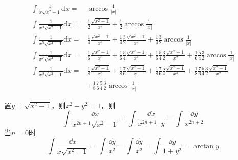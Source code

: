 \begin{theorem}[双曲根式倒数型]
\vspace{-15pt}
\begin{align*}
    \int\frac{1}{x\sqrt{x^{2}-1}}\mathrm{d}x=&\arccos\frac{1}{|x|}\\
    \int\frac{1}{x^{3}\sqrt{x^{2}-1}}\mathrm{d}x=&\frac{1}{2}\frac{\sqrt{x^{2}-1}}{x^{2}}+\frac{1}{2}\arccos\frac{1}{|x|}\\
    \int\frac{1}{x^5\sqrt{x^2-1}}\mathrm{d}x=&\frac{1}{4}\frac{\sqrt{x^2-1}}{x^4}+\frac{1}{4}\frac{3}{2}\frac{\sqrt{x^2-1}}{x^2}+\frac{1}{4}\frac{3}{2}\arccos\frac{1}{|x|}\\
    \int\frac{1}{x^7\sqrt{x^2-1}}\mathrm{d}x=&\frac{1}{6}\frac{\sqrt{x^2-1}}{x^6}+\frac{1}{6}\frac{5}{4}\frac{\sqrt{x^2-1}}{x^4}+\frac{1}{6}\frac{5}{4}\frac{3}{2}\frac{\sqrt{x^2-1}}{x^2}+\frac{1}{6}\frac{5}{4}\frac{3}{2}\arccos\frac{1}{|x|}\\
    \int\frac{1}{x^{9}\sqrt{x^{2}-1}}\mathrm{d}x=&\frac{1}{8}\frac{\sqrt{x^{2}-1}}{x^{8}}+\frac{1}{8}\frac{7}{6}\frac{\sqrt{x^{2}-1}}{x^{6}}+\frac{1}{8}\frac{7}{6}\frac{5}{4}\frac{\sqrt{x^{2}-1}}{x^{4}}+\frac{1}{8}\frac{7}{6}\frac{5}{4}\frac{3}{2}\frac{\sqrt{x^{2}-1}}{x^{2}}\\
    &+\frac{1}{8}\frac{7}{6}\frac{5}{4}\frac{3}{2}\arccos\frac{1}{|x|}
\end{align*}
\end{theorem}
置$y=\sqrt{x^{2}-1}$，则$x^2-y^2=1$，则
\[\int\frac{\dd x}{x^{2n+1}\sqrt{x^{2}-1}}=\int\frac{\dd x}{x^{2n+1}\cdot y}=\int\frac{\dd y}{x^{2n+2}}\]
当$n=0$时\[\int\frac{\dd x}{x\sqrt{x^2-1}}=\int\frac{\dd y}{x^2}=\int\frac{\dd y}{x^2}=\int\frac{\dd y}{1+y^2}=\arctan y\]


